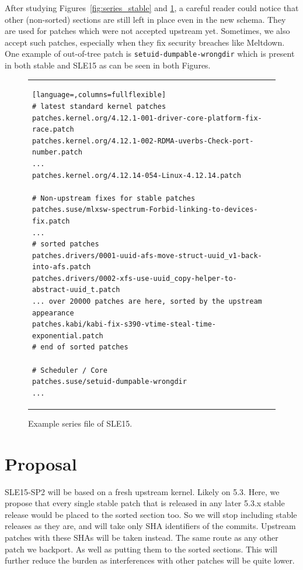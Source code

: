 \documentclass[10pt]{llncs}
\newcommand{\code}[2][]{\lstinline[columns=fullflexible, #1]$#2$}
\newcommand{\file}[2][]{\code[language={}, #1]{#2}}
\begin{document}
After studying Figures\ \ref{fig:series_stable} and \ref{fig:series_sle15}, a
careful reader could notice that other (non-sorted) sections are still left in
place even in the new schema. They are used for patches which were not
accepted upstream yet. Sometimes, we also accept such patches, especially
when they fix security breaches like Meltdown. One example of out-of-tree
patch is \file{setuid-dumpable-wrongdir} which is present in both stable and
SLE15 as can be seen in both Figures.

\begin{figure}[bt]
  \begin{center}
    \begin{tabular}{l}
      \begin{lstlisting}[language=,columns=fullflexible]
# latest standard kernel patches
patches.kernel.org/4.12.1-001-driver-core-platform-fix-race.patch
patches.kernel.org/4.12.1-002-RDMA-uverbs-Check-port-number.patch
...
patches.kernel.org/4.12.14-054-Linux-4.12.14.patch

# Non-upstream fixes for stable patches
patches.suse/mlxsw-spectrum-Forbid-linking-to-devices-fix.patch
...
# sorted patches
patches.drivers/0001-uuid-afs-move-struct-uuid_v1-back-into-afs.patch
patches.drivers/0002-xfs-use-uuid_copy-helper-to-abstract-uuid_t.patch
... over 20000 patches are here, sorted by the upstream appearance
patches.kabi/kabi-fix-s390-vtime-steal-time-exponential.patch
# end of sorted patches

# Scheduler / Core
patches.suse/setuid-dumpable-wrongdir
...
      \end{lstlisting}
    \end{tabular}
  \end{center}

  \caption{Example series file of SLE15.}
  \label{fig:series_sle15}
\end{figure}

\section{Proposal} \label{sec:proposal}
SLE15-SP2 will be based on a fresh upstream kernel. Likely on 5.3. Here, we
propose that every single stable patch that is released in any later 5.3.x
stable release would be placed to the sorted section too. So we will stop
including stable releases as they are, and will take only SHA identifiers of
the commits. Upstream patches with these SHAs will be taken instead. The same
route as any other patch we backport. As well as putting them to the sorted
sections. This will further reduce the burden as interferences with other
patches will be quite lower.
\end{document}
